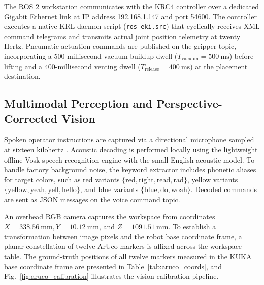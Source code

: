 \documentclass{svproc}
\begin{document}
The ROS 2 workstation communicates with the KRC4 controller over a dedicated Gigabit Ethernet link at IP address 192.168.1.147 and port 54600. The controller executes a native KRL daemon script (\texttt{ros\_eki.src}) \cite{kuka_eki2019} that cyclically receives XML command telegrams and transmits actual joint position telemetry at twenty Hertz. Pneumatic actuation commands are published on the gripper topic, incorporating a 500-millisecond vacuum buildup dwell ($T_{\text{vacuum}} = \SI{500}{\milli\second}$) before lifting and a 400-millisecond venting dwell ($T_{\text{release}} = \SI{400}{\milli\second}$) at the placement destination.

\subsection{Multimodal Perception and Perspective-Corrected Vision}
Spoken operator instructions are captured via a directional microphone sampled at sixteen kilohertz \cite{trovato2020,perzylo2016}. Acoustic decoding is performed locally using the lightweight offline Vosk speech recognition engine \cite{vosk2020} with the small English acoustic model. To handle factory background noise, the keyword extractor includes phonetic aliases for target colors, such as red variants $\{\text{red}, \text{right}, \text{read}, \text{rad}\}$, yellow variants $\{\text{yellow}, \text{yeah}, \text{yell}, \text{hello}\}$, and blue variants $\{\text{blue}, \text{do}, \text{woah}\}$. Decoded commands are sent as JSON messages on the voice command topic.

An overhead RGB camera captures the workspace from coordinates $X = \SI{338.56}{\milli\meter}, Y = \SI{10.12}{\milli\meter}$, and $Z = \SI{1091.51}{\milli\meter}$. To establish a transformation between image pixels and the robot base coordinate frame, a planar constellation of twelve ArUco markers \cite{aruco2014} is affixed across the workspace table. The ground-truth positions of all twelve markers measured in the KUKA base coordinate frame are presented in Table~\ref{tab:aruco_coords}, and Fig.~\ref{fig:aruco_calibration} illustrates the vision calibration pipeline.
\end{document}
